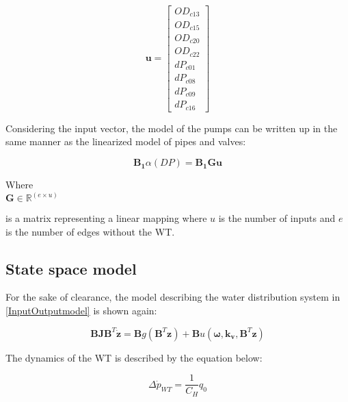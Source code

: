 \begin{equation}
\pmb{u} =
\begin{bmatrix} 
OD_{c13} \\
OD_{c15} \\
OD_{c20} \\
OD_{c22} \\
dP_{c01} \\
dP_{c08} \\
dP_{c09} \\
dP_{c16} 
\label{inputvector}
\end{bmatrix} 
\end{equation}

Considering the input vector, the model of the pumps can be written up in the same manner as the linearized model of pipes and valves: 

\begin{equation}
\pmb{B_1} \alpha(DP) = \pmb{B_1} \pmb{G} \pmb{u}
\label{gamma_lin}
\end{equation}

\begin{minipage}[t]{0.20\textwidth}
Where\\
\hspace*{8mm} $\pmb{G} \in \pmb{\mathbb{R}}^{(e \times u)} $ 
\end{minipage}
\begin{minipage}[t]{0.68\textwidth}
\vspace*{2mm}
is a matrix representing a linear mapping where $u$ is the number of inputs and $e$ is the number of edges without the WT. 
\end{minipage} 


\subsection{State space model}
 \label{SystemLin}

For the sake of clearance, the model describing the water distribution system in \eqref{InputOutputmodel} is shown again:  

\begin{equation}
 \pmb{B}\pmb{J {B}}^T \pmb{\dot{z}} = \pmb{B} g(\pmb{B}^T \pmb{z})+ \pmb{B} u(\pmb{\omega},\pmb{k_v	}, \pmb{B}^T \pmb{z})
 \label{InputOutputmodel}
\end{equation}

The dynamics of the WT is described by the equation below: 

\begin{equation}
\Delta \dot{p}_{WT} = \frac{1}{C_H} q_0
 \label{WT_eq}
\end{equation}

